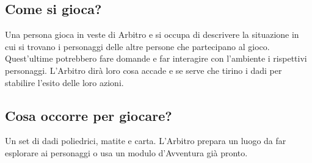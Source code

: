\documentclass[itdr]{subfiles}
\begin{document}
\subsection*{Come si gioca?}
Una persona gioca in veste di Arbitro e si occupa di descrivere la situazione in cui si trovano i personaggi delle altre persone che partecipano al gioco. Quest’ultime potrebbero fare domande e far interagire con l'ambiente i rispettivi personaggi. L’Arbitro dirà loro cosa accade e se serve che tirino i dadi per stabilire l’esito delle loro azioni.

\subsection*{Cosa occorre per giocare?}
Un set di dadi poliedrici, matite e carta. L’Arbitro prepara un luogo da far esplorare ai personaggi o usa un modulo d’Avventura già pronto.
\end{document}
